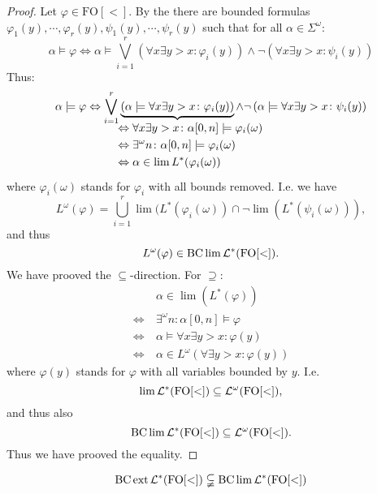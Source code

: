 \begin{proof}
Let $\varphi \in \mathrm{FO[<]}$. By the \cite[Normal Form Theorem (4.4)]{CombTheoryOmegaAut} there are bounded formulas $\varphi_1(y),\dotsb,\varphi_r(y),\psi_1(y),\dotsb,\psi_r(y)$ such that for all $\alpha \in \Sigma^\omega$:
\[ \alpha \models \varphi \Leftrightarrow \alpha \models \bigvee_{i=1}^r \left( \forall x \exists y > x \colon \varphi_i (y) \right) \wedge \neg \left( \forall x \exists y > x \colon \psi_i (y) \right) \]
Thus:
\[
\alpha \models \varphi \Leftrightarrow \bigvee_{i=1}^r
\underbrace{ \left( \alpha \models \forall x \exists y > x \colon \varphi_i (y) \right) }_
{\mathclap{\quad\quad \begin{aligned}
& \Leftrightarrow \forall x \exists y > x \colon \alpha[0,n] \models \varphi_i(\omega) \\
& \Leftrightarrow \exists^\omega n \colon \alpha[0,n] \models \varphi_i(\omega) \\
& \Leftrightarrow \alpha \in \lim L^*( \varphi_i(\omega) )
\end{aligned}}}
\wedge \neg \left( \alpha \models \forall x \exists y > x \colon \psi_i (y) \right)
\]
where $\varphi_i(\omega)$ stands for $\varphi_i$ with all bounds removed.
I.e. we have
\[ L^\omega(\varphi) = \bigcup_{i=1}^r \lim( L^* (\varphi_i (\omega)) \cap \neg \lim( L^* (\psi_i (\omega))) , \]
and thus
\[ L^\omega(\varphi) \in \operatorname{BC} \lim \mathcal{L}^* (\mathrm{FO[<]}) . \]
We have prooved the $\subseteq$-direction. For $\supseteq$:
\begin{align*}
& \alpha \in \lim( L^*(\varphi) ) \\
\Leftrightarrow \ & \exists^\omega n \colon \alpha[0,n] \models \varphi \\
\Leftrightarrow \ & \alpha \models \forall x \exists y > x \colon \varphi(y) \\
\Leftrightarrow \ & \alpha \in L^\omega ( \forall \exists y > x \colon \varphi(y) )
\end{align*}
where $\varphi(y)$ stands for $\varphi$ with all variables bounded by $y$.
I.e.
\[ \lim \mathcal{L}^* (\mathrm{FO[<]}) \subseteq \mathcal{L}^\omega (\mathrm{FO[<]}) , \]
and thus also
\[ \operatorname{BC} \lim \mathcal{L}^* (\mathrm{FO[<]}) \subseteq \mathcal{L}^\omega (\mathrm{FO[<]}) . \]
Thus we have prooved the equality.
\end{proof}

\begin{thm}
\[ \operatorname{BC} \operatorname{ext} \mathcal{L}^*( \mathrm{FO[<]} ) \subsetneqq \operatorname{BC} \lim \mathcal{L}^* ( \mathrm{FO[<]} ) \]
\end{thm}

